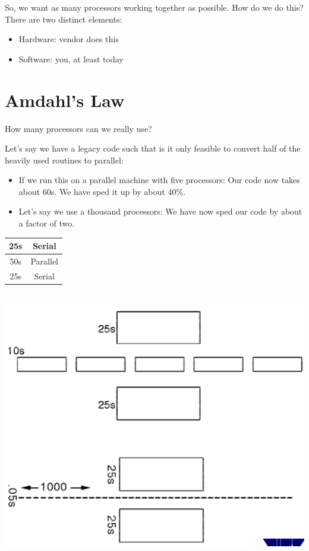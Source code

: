 \documentclass[12pt, a4paper]{book}
\begin{document}
So, we want as many processors working
together as possible. How do we do this?
There are two distinct elements:
\begin{itemize}
    \item Hardware: vendor does this
    \item Software: you, at least today
\end{itemize}

\section{Amdahl's Law}
How many processors can we really use? \\

\begin{minipage}{0.6\linewidth}
    Let's say we have a legacy
    code such that is it only
    feasible to convert half of
    the heavily used routines
    to parallel:
    \begin{itemize}
        \item If we run this on a parallel
              machine with five processors:
              Our code now takes about
              60s. We have sped it up
              by about 40\%.
        \item Let's say
              we use a thousand
              processors:
              We have now sped our code
              by about a factor of two.
    \end{itemize}
\end{minipage}
\hfill
\begin{minipage}{0.3\linewidth}
    \centering
    \begin{tabular}{|c|c|}
        \hline
        25s & Serial   \\
        \hline
        50s & Parallel \\
        \hline
        25s & Serial   \\
        \hline
    \end{tabular}
    \\
    \includegraphics[width=0.99\linewidth]{figures/amdahl-law02.png}
\end{minipage}
\end{document}
